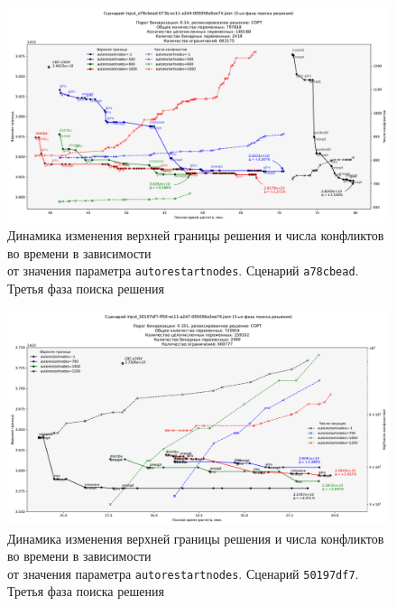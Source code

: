 \documentclass[%
	11pt,
	a4paper,
	utf8,
		]{article}
\begin{document}
{%
\begin{figure}[!h]
	\centering
	\includegraphics[scale=0.42]{figures/a78cbead_autorestartnodes_3_phase.pdf}
	\caption{ Динамика изменения верхней границы решения и числа конфликтов во времени в зависимости \\от значения параметра \texttt{autorestartnodes}. Сценарий \texttt{a78cbead}. Третья фаза поиска решения }\label{fig:a78cbead_autorestartnodes_3_phase}
\end{figure}

\begin{figure}[!h]
	\centering
	\includegraphics[scale=0.42]{figures/50197df7_autorestartnodes.pdf}
	\caption{ Динамика изменения верхней границы решения и числа конфликтов во времени в зависимости \\от значения параметра \texttt{autorestartnodes}. Сценарий \texttt{50197df7}. Третья фаза поиска решения}\label{fig:50197df7_autorestartnodes}
\end{figure}

}
\end{document}
